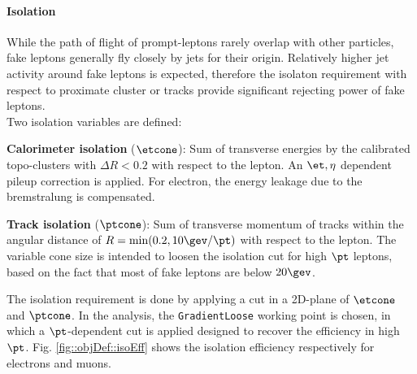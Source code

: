 

\paragraph{Isolation}
While the path of flight of prompt-leptons rarely overlap with other particles, fake leptons generally fly closely by jets for their origin. Relatively higher jet activity around fake leptons is expected, therefore the isolaton requirement with respect to proximate cluster or tracks provide significant rejecting power of fake leptons. \\

Two isolation variables are defined:

\begin{description}
\item {\textbf{Calorimeter isolation} ($\etcone$)}: Sum of transverse energies by the calibrated topo-clusters 
with  $\Delta R<0.2$ with respect to the lepton. An $\et,\eta$ dependent pileup correction is applied. For electron, the energy leakage due to the bremstralung is compensated. 

\item {\textbf{Track isolation} ($\ptcone$)}: Sum of transverse momentum of tracks within the angular distance of $R=\min(0.2, 10\gev/\pt)$ with respect to the lepton. The variable cone size is intended to loosen the isolation cut for high $\pt$ leptons, based on the fact that most of fake leptons are below $20\gev$.
\end{description}

The isolation requirement is done by applying a cut in a 2D-plane of $\etcone$ and $\ptcone$. 
In the analysis, the \texttt{GradientLoose} working point is chosen, in which a $\pt$-dependent cut is applied designed to recover the efficiency in high $\pt$. Fig. \ref{fig::objDef::isoEff} shows the isolation efficiency respectively for electrons and muons. \\

